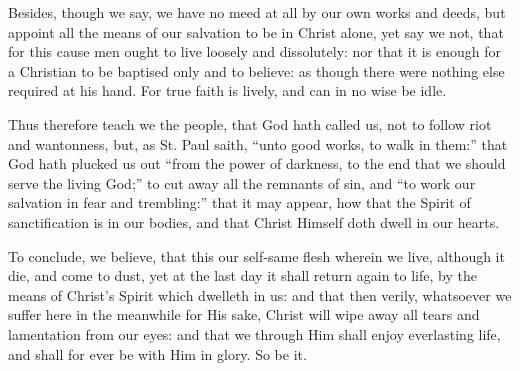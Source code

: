 Besides, though we say, we have no meed at all by our own works and
deeds, but appoint all the means of our salvation to be in Christ alone,
yet say we not, that for this cause men ought to live loosely and dissolutely:
nor that it is enough for a Christian to be baptised only and to believe:
as though there were nothing else required at his hand. For true
faith is lively, and can in no wise be idle.

Thus therefore teach we the people, that God hath called us, not
to follow riot and wantonness, but, as St. Paul saith, “unto good
works, to walk in them:” that God hath plucked us out “from
the power of darkness, to the end that we should serve the living God;”
to cut away all the remnants of sin, and “to work our salvation
in fear and trembling:” that it may appear, how that the Spirit
of sanctification is in our bodies, and that Christ Himself doth dwell
in our hearts.

To conclude, we believe, that this our self-same flesh wherein we
live, although it die, and come to dust, yet at the last day it shall
return again to life, by the means of Christ’s Spirit which dwelleth
in us: and that then verily, whatsoever we suffer here in the meanwhile
for His sake, Christ will wipe away
all tears and lamentation from our eyes: and that we through Him shall
enjoy everlasting life, and shall for ever be with Him in glory.
So be it.


